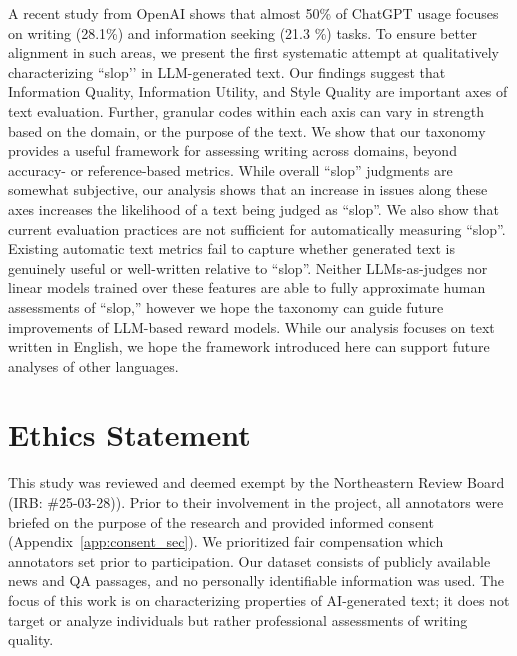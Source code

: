 \documentclass{article} %
\begin{document}
A recent study from OpenAI \citep{NBERw34255} shows that almost 50\% of ChatGPT usage focuses on writing (28.1\%) and information seeking (21.3 \%) tasks. 
To ensure better alignment in such areas, we present the first systematic attempt at qualitatively characterizing ``slop’’ in LLM-generated text. 
Our findings suggest that \textcolor{infoquality}{Information Quality}, \textcolor{infoutility}{Information Utility}, and \textcolor{stylequality}{Style Quality} are important axes of text evaluation. Further, granular codes within each axis can vary in strength based on the domain, or the purpose of the text. 
We show that our taxonomy provides a useful framework for assessing writing across domains, beyond accuracy- or reference-based metrics. 
While overall ``slop'' judgments are somewhat subjective, our analysis shows that an increase in issues along these axes increases the likelihood of a text being judged as ``slop''.  We also show that current evaluation practices are not sufficient for automatically measuring ``slop''. Existing automatic text metrics fail to capture whether generated text is genuinely useful or well-written relative to ``slop''. Neither LLMs-as-judges nor linear models trained over these features are able to fully approximate human assessments of ``slop,'' however we hope the taxonomy can guide future improvements of LLM-based reward models. While our analysis focuses on text written in English, we hope the framework introduced here can support future analyses of other languages.

\section{Ethics Statement}
This study was reviewed and deemed exempt by the Northeastern Review Board (IRB: \#25-03-28)). Prior to their involvement in the project, all annotators were briefed on the purpose of the research and provided informed consent (Appendix~\ref{app:consent_sec}). 
We prioritized fair compensation which annotators set prior to participation. 
Our dataset consists of publicly available news and QA passages, and no personally identifiable information was used. The focus of this work is on characterizing properties of AI-generated text; it does not target or analyze individuals but rather professional assessments of writing quality.





\clearpage
\appendix
\end{document}
